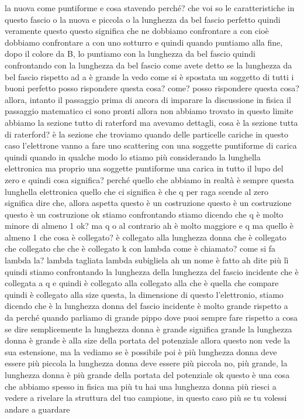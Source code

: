 \begin{soluzione}
{   la nuova come puntiforme e cosa stavendo perché? che voi so le caratteristiche in questo fascio o la nuova e piccola o la lunghezza da bel fascio perfetto quindi veramente questo questo significa che ne dobbiamo confrontare a con cioè dobbiamo confrontare a con uno sotturro e quindi quando puntiamo alla fine, dopo il colore da B, lo puntiamo con la lunghezza da bel fascio quindi confrontando con la lunghezza da bel fascio come avete detto se la lunghezza da bel fascio rispetto ad a è grande la vedo come si è spostata un soggetto di tutti i buoni perfetto posso rispondere questa cosa? come? posso rispondere questa cosa? allora, intanto il passaggio prima di ancora di imparare la discussione in fisica il passaggio matematico ci sono pronti allora non abbiamo trovato in questo limite abbiamo la sezione tutto di raterford ma avevamo dettagli, cosa è la sezione tutta di raterford? è la sezione che troviamo quando delle particelle cariche in questo caso l'elettrone vanno a fare uno scattering con una soggette puntiforme di carica quindi quando in qualche modo lo stiamo più considerando la lunghella elettronica ma proprio una soggette puntiforme una carica in tutto il lupo del zero e quindi cosa significa? perché quello che abbiamo in realtà è sempre questa lunghella elettronica quello che ci significa è che q per raga scende al zero significa dire che, allora aspetta questo è un costruzione questo è un costruzione questo è un costruzione ok stiamo confrontando stiamo dicendo che q è molto minore di almeno 1 ok? ma q o al contrario ah è molto maggiore e q ma quello è almeno 1 che cosa è collegato? è collegato alla lunghezza donna che è collegato che collegato che che è collegato k con lambda come è chiamato? come si fa lambda la? lambda tagliata lambda subigliela ah un nome è fatto ah dite più lì quindi stiamo confrontando la lunghezza della lunghezza del fascio incidente che è collegata a q e quindi è collegato alla collegato alla che è quella che compare quindi è collegato alla size questa, la dimensione di questo l'elettronio, stiamo dicendo che è la lunghezza donna del fascio incidente è molto grande rispetto a da perché quando parliamo di grande pippo dove puoi sempre fare rispetto a cosa se dire semplicemente la lunghezza donna è grande significa grande la lunghezza donna è grande è alla size della portata del potenziale allora questo non vede la sua estensione, ma la vediamo se è possibile poi è più lunghezza donna deve essere più piccola la lunghezza donna deve essere più piccola no, più grande, la lunghezza donna è più grande della portata del potenziale ok questo è una cosa che abbiamo spesso in fisica ma più tu hai una lunghezza donna più riesci a vedere a rivelare la struttura del tuo campione, in questo caso più se tu volessi andare a guardare 
   
}
\end{soluzione}

